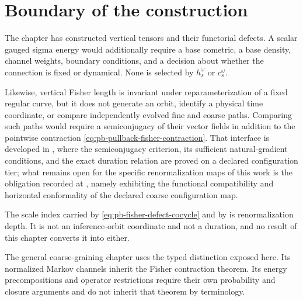 \section{Boundary of the construction}
\label{sec:pb-boundary}

The chapter has constructed vertical tensors and their functorial defects.  A
scalar gauged sigma energy would additionally require a base cometric, a base
density, channel weights, boundary conditions, and a decision about whether
the connection is fixed or dynamical.  None is selected by
$h_s^\omega$ or $c_s^\omega$.  

Likewise, vertical Fisher length is invariant under reparameterization of a
fixed regular curve, but it does not generate an orbit, identify a physical
time coordinate, or compare independently evolved fine and coarse paths.
Comparing such paths would require a semiconjugacy of their vector fields in
addition to the pointwise contraction
\eqref{eq:pb-pullback-fisher-contraction}.  That interface is developed in
, where the semiconjugacy criterion, its
sufficient natural-gradient conditions, and the exact duration relation are
proved on a declared configuration tier; what remains open for the specific
renormalization maps of this work is the obligation recorded at
, namely exhibiting the functional
compatibility and horizontal conformality of the declared coarse configuration
map.  

The scale index carried by \eqref{eq:pb-fisher-defect-cocycle} and by
 is renormalization depth.  It is not an
inference-orbit coordinate and not a duration, and no result of this chapter
converts it into either.  

The general coarse-graining chapter uses the typed distinction exposed here.
Its normalized Markov channels inherit the Fisher contraction theorem.  Its energy
precompositions and operator restrictions require their own probability and
closure arguments and do not inherit that theorem by terminology.
